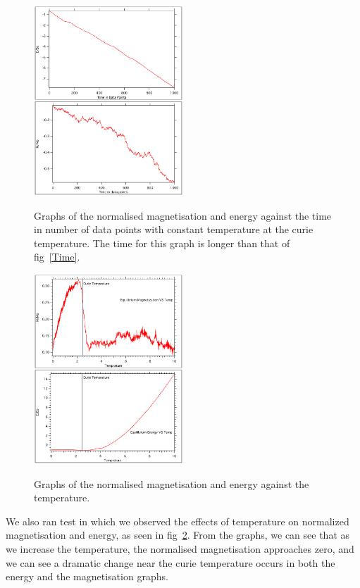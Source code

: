 \documentclass{article}
\begin{document}
  \begin{figure}[h]
  	\caption{Graphs of the normalised magnetisation and energy against the time in number of data points with constant temperature at the curie temperature. The time for this graph is longer than that of fig~\ref{Time}.}
  	\centering
  	\includegraphics[width=0.5\textwidth]{TimeLong} \label{TimeLong}
  \end{figure}

  \begin{figure}[h]
  	\caption{Graphs of the normalised magnetisation and energy against the temperature.}
  	\centering
  	\includegraphics[width=0.5\textwidth]{Temp} \label{Temp}
  \end{figure}

We also ran test in which we observed the effects of temperature on normalized magnetisation and energy, as seen in fig~\ref{Temp}. From the graphs, we can see that as we increase the temperature, the normalised magnetisation approaches zero, and we can see a dramatic change near the curie temperature occurs in both the energy and the magnetisation graphs. 
\end{document}
